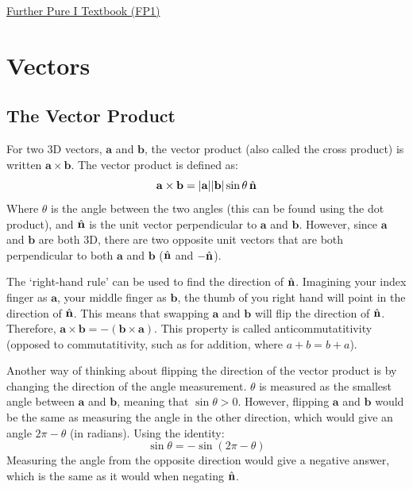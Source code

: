 \href{https://drive.google.com/drive/folders/13SmG6rx6WKPDzJa3Cav_TOF4B4u4sRZd}{\hypertarget{book:FP1}{Further Pure I Textbook (FP1)}}

\section{Vectors} \label{pure_vectors}
    \subsection{The Vector Product}
        For two 3D vectors, $\mathbf{a}$ and $\mathbf{b}$, the vector product (also called the cross product) is written $\mathbf{a}\times\mathbf{b}$.
        The vector product is defined as:
        \begin{equation} \label{eq:vector_product}
            \mathbf{a}\times\mathbf{b}=|\mathbf{a}||\mathbf{b}|\sin \theta\,\hat{\mathbf{n}}
        \end{equation}
        Where $\theta$ is the angle between the two angles (this can be found using the dot product), and $\hat{\mathbf{n}}$ is the unit vector perpendicular to $\mathbf{a}$ and $\mathbf{b}$.
        However, since $\mathbf{a}$ and $\mathbf{b}$ are both 3D, there are two opposite unit vectors that are both perpendicular to both $\mathbf{a}$ and $\mathbf{b}$ ($\hat{\mathbf{n}}$ and $-\hat{\mathbf{n}}$).

        The `right-hand rule' can be used to find the direction of $\hat{\mathbf{n}}$.
        Imagining your index finger as $\mathbf{a}$, your middle finger as $\mathbf{b}$, the thumb of you right hand will point in the direction of $\hat{\mathbf{n}}$.
        This means that swapping $\mathbf{a}$ and $\mathbf{b}$ will flip the direction of $\hat{\mathbf{n}}$.
        Therefore, $\mathbf{a}\times\mathbf{b}=-(\mathbf{b}\times\mathbf{a})$.
        This property is called anticommutatitivity (opposed to commutatitivity, such as for addition, where $a+b=b+a$).

        Another way of thinking about flipping the direction of the vector product is by changing the direction of the angle measurement.
        $\theta$ is measured as the smallest angle between $\mathbf{a}$ and $\mathbf{b}$, meaning that $\sin\theta>0$.
        However, flipping $\mathbf{a}$ and $\mathbf{b}$ would be the same as measuring the angle in the other direction, which would give an angle $2\pi-\theta$ (in \glspl{radian}).
        Using the identity:
        \begin{equation}
            \sin\theta=-\sin(2\pi-\theta)
        \end{equation}
        Measuring the angle from the opposite direction would give a negative answer, which is the same as it would when negating $\hat{\mathbf{n}}$.

